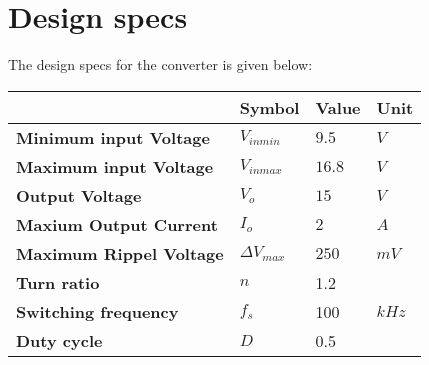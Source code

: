 \section{Design specs}
The design specs for the converter is given below:
\begin{table}[h!]
\begin{center}
\begin{tabular}{|l|l|l|l|}
\hline
\textbf{}                         & \textbf{Symbol}            & \textbf{Value} & \textbf{Unit} \\ \hline
\textbf{Minimum input   Voltage}  & \textbf{$V_{inmin}$}       & \textbf{$9.5$}     & \textbf{$V$}      \\ \hline
\textbf{Maximum input   Voltage}  & \textbf{$V_{inmax}$}       & \textbf{$16.8$}    & \textbf{$V$}      \\ \hline
\textbf{Output Voltage}           & \textbf{$V_o$}             & \textbf{$15$}      & \textbf{$V$}      \\ \hline
\textbf{Maxium Output Current}    & \textbf{$I_o$}             & \textbf{$2$}       & \textbf{$A$}      \\ \hline
\textbf{Maximum Rippel   Voltage} & \textbf{$\Delta V_{max}$}  & \textbf{$250$}     & \textbf{$mV$}     \\ \hline
\textbf{Turn ratio}               & $n$                        &  1.2              &                   \\ \hline
\textbf{Switching frequency}      & \textbf{$f_s$}             & 100                & \textbf{$kHz$}    \\ \hline
\textbf{Duty cycle}               & \textbf{$D$}               & 0.5                &                   \\ \hline
\end{tabular}
\end{center}
\end{table}